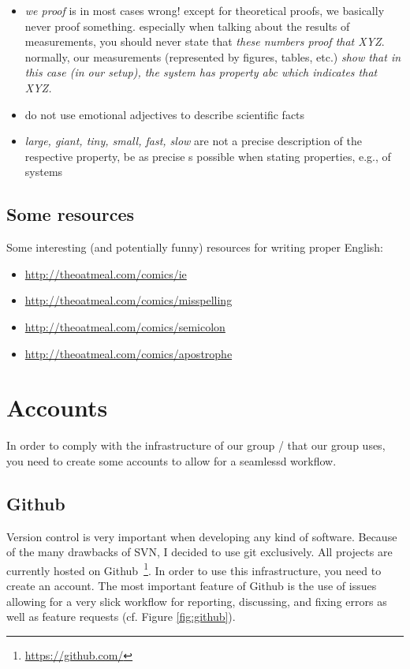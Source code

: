\documentclass{article}
\begin{document}
\begin{itemize}
	\item \emph{we proof} is in most cases wrong! except for theoretical proofs, we basically never proof something. especially when talking about the results of measurements, you should never state that \emph{these numbers proof that XYZ}. normally, our measurements (represented by figures, tables, etc.) \emph{show that in this case (in our setup), the system has property abc which indicates that XYZ.}
	\item do not use emotional adjectives to describe scientific facts
	\item \emph{large, giant, tiny, small, fast, slow} are not a precise description of the respective property, be as precise s possible when stating properties, e.g., of systems
\end{itemize}


\subsection{Some resources}

Some interesting (and potentially funny) resources for writing proper English:
\begin{itemize}
	\item \url{http://theoatmeal.com/comics/ie}
	\item \url{http://theoatmeal.com/comics/misspelling}
	\item \url{http://theoatmeal.com/comics/semicolon}
	\item \url{http://theoatmeal.com/comics/apostrophe}
\end{itemize}














\section{Accounts}

In order to comply with the infrastructure of our group / that our group uses, you need to create some accounts to allow for a seamlessd workflow.


\subsection{Github}

Version control is very important when developing any kind of software.
Because of the many drawbacks of SVN, I decided to use git exclusively.
All projects are currently hosted on Github~\footnote{\url{https://github.com/}}.
In order to use this infrastructure, you need to create an account.
The most important feature of Github is the use of issues allowing for a very slick workflow for reporting, discussing, and fixing errors as well as feature requests (cf. Figure \ref{fig:github}).
\end{document}

